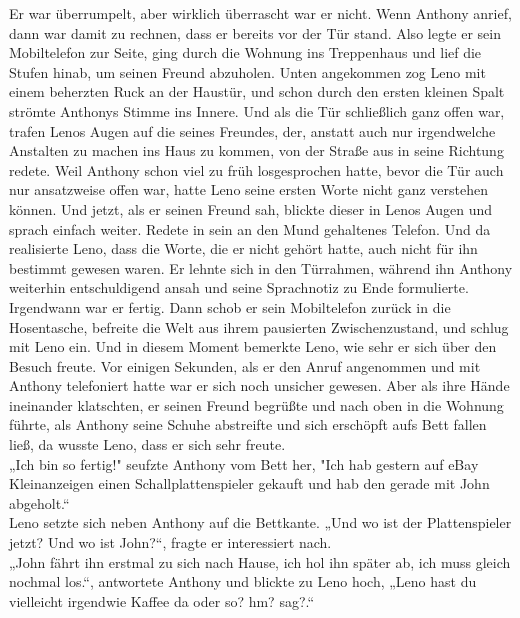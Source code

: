\documentclass[ngerman,smalldemyvopaper,11pt,oneside,onecolumn,openright,extrafontsizes]{memoir}
\begin{document}
Er war überrumpelt, aber wirklich überrascht war er nicht. Wenn Anthony anrief, dann war damit zu rechnen, dass er bereits vor der Tür stand. Also legte er sein Mobiltelefon zur Seite, ging durch die Wohnung ins Treppenhaus und lief die Stufen hinab, um seinen Freund abzuholen. Unten angekommen zog Leno mit einem beherzten Ruck an der Haustür, und schon durch den ersten kleinen Spalt strömte Anthonys Stimme ins Innere. Und als die Tür schließlich ganz offen war, trafen Lenos Augen auf die seines Freundes, der, anstatt auch nur irgendwelche Anstalten zu machen ins Haus zu kommen, von der Straße aus in seine Richtung redete. Weil Anthony schon viel zu früh losgesprochen hatte, bevor die Tür auch nur ansatzweise offen war, hatte Leno seine ersten Worte nicht ganz verstehen können. Und jetzt, als er seinen Freund sah, blickte dieser in Lenos Augen und sprach einfach weiter. Redete in sein an den Mund gehaltenes Telefon. Und da realisierte Leno, dass die Worte, die er nicht gehört hatte, auch nicht für ihn bestimmt gewesen waren. Er lehnte sich in den Türrahmen, während ihn Anthony weiterhin entschuldigend ansah und seine Sprachnotiz zu Ende formulierte. Irgendwann war er fertig. Dann schob er sein Mobiltelefon zurück in die Hosentasche, befreite die Welt aus ihrem pausierten Zwischenzustand, und schlug mit Leno ein. Und in diesem Moment bemerkte Leno, wie sehr er sich über den Besuch freute. Vor einigen Sekunden, als er den Anruf angenommen und mit Anthony telefoniert hatte war er sich noch unsicher gewesen. Aber als ihre Hände ineinander klatschten, er seinen Freund begrüßte und nach oben in die Wohnung führte, als Anthony seine Schuhe abstreifte und sich erschöpft aufs Bett fallen ließ, da wusste Leno, dass er sich sehr freute.
\vspace{0.5em} \\
„Ich bin so fertig!" seufzte Anthony vom Bett her, "Ich hab gestern auf eBay Kleinanzeigen einen Schallplattenspieler gekauft und hab den gerade mit John abgeholt.“
\vspace{0.5em} \\
Leno setzte sich neben Anthony auf die Bettkante. „Und wo ist der Plattenspieler jetzt? Und wo ist John?“, fragte er interessiert nach.
\vspace{0.5em} \\
„John fährt ihn erstmal zu sich nach Hause, ich hol ihn später ab, ich muss gleich nochmal los.“, antwortete Anthony und blickte zu Leno hoch, „Leno hast du vielleicht irgendwie Kaffee da oder so? hm? sag?.“
\vspace{0.5em} \\
\end{document}
